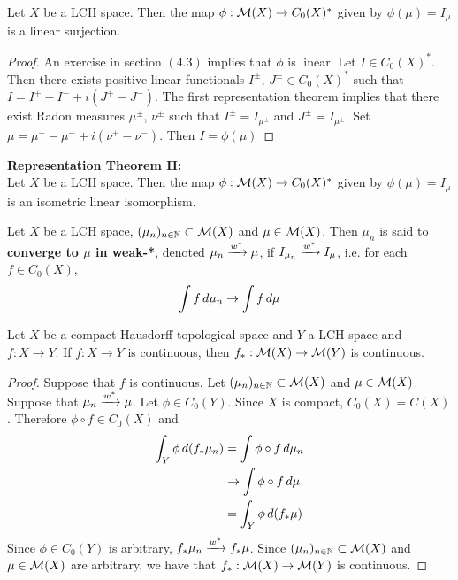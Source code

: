 \documentclass{book}
\begin{document}
	\begin{ex}  
	Let $X$ be a LCH space. Then the map $ \phi: \mathcal{M}(X) \rightarrow C_0(X)^*$ given by $\phi(\mu) = I_{\mu}$ is a linear surjection.
	\end{ex}
	
	\begin{proof}
	An exercise in section $(4.3)$ implies that $\phi$ is linear. Let $I \in C_0(X)^*$. Then there exists positive linear functionals $I^{\pm}$, $J^{\pm} \in C_0(X)^*$ such that $I = I^+ - I^- + i(J^+ - J^-)$. The first representation theorem implies that there exist Radon measures $\mu^{\pm}$, $\nu^{\pm}$ such that $I^{\pm} = I_{\mu^{\pm}}$ and $J^{\pm} = I_{\mu^{\pm}}$. Set $\mu = \mu^+ - \mu^- +i(\nu^+ - \nu ^-)$. Then $I = \phi(\mu)$
	\end{proof}
	
	\begin{thm}\textbf{Representation Theorem II:}\\
	Let $X$ be a LCH space. Then the map $\phi: \mathcal{M}(X) \rightarrow C_0(X)^*$ given by $\phi(\mu) = I_{\mu}$ is an isometric linear isomorphism. 
	\end{thm}
	
	
	
	
	\begin{defn}  
	Let $X$ be a LCH space, $(\mu_n)_{n \in \mathbb{N}} \subset \mathcal{M}(X)$ and $\mu \in \mathcal{M}(X)$. Then $\mu_n$ is said to  \textbf{converge to $\mu$ in weak-*}, denoted $\mu_n \xrightarrow{w^*}\mu$, if $I_{\mu_n} \xrightarrow{w^*} I_{\mu}$, i.e. for each $f \in C_0(X)$, $$\int f \, d \mu_n \rightarrow \int f \, d \mu$$
	\end{defn}
	
	\begin{ex}  
		Let $X$ be a compact Hausdorff topological space and $Y$ a LCH space and $f:X \rightarrow Y$. If $f:X \rightarrow Y$ is continuous, then $f_*: \mathcal{M}(X) \rightarrow \mathcal{M}(Y)$ is continuous. 
	\end{ex}

	\begin{proof}
		Suppose that $f$ is continuous. Let $(\mu_n)_{n \in \mathbb{N}} \subset \mathcal{M}(X)$ and $\mu \in \mathcal{M}(X)$. Suppose that $\mu_n \xrightarrow{w^*} \mu$. Let $\phi \in C_0(Y)$. Since $X$ is compact, $C_0(X) = C(X)$. Therefore $\phi \circ f \in C_0(X)$ and 
		\begin{align*}
			\int_Y \phi \, d (f_* \mu_n) 
			& = \int \phi \circ f \, d \mu_n \\
			& \rightarrow  \int \phi \circ f \, d \mu \\
			& = \int_Y \phi \, d (f_* \mu) 
		\end{align*}
		Since $\phi \in C_0(Y)$ is arbitrary, $f_*\mu_n \xrightarrow{w^*} f_* \mu$. Since $(\mu_n)_{n \in \mathbb{N}} \subset \mathcal{M}(X)$ and $\mu \in \mathcal{M}(X)$ are arbitrary, we have that $f_*: \mathcal{M}(X) \rightarrow \mathcal{M}(Y)$ is continuous. 
	\end{proof}
\end{document}
